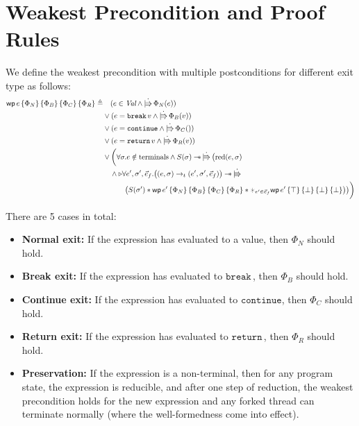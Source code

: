 \documentclass{article}
\numberwithin{algorithm}{section}
\newcommand{\progspec}[1]{\{ #1 \}}
\newcommand{\cbreak}{\texttt{break}\,}
\newcommand{\ccontinue}{\texttt{continue}}
\newcommand{\creturn}{\texttt{return}\,}
\newcommand{\tred}{\rightarrow_t}
\newcommand{\cred}{\text{red}}
\newcommand{\wand}{-\mkern-8mu*\,}
\newcommand{\upd}{\dot{|\mkern-8mu\Rrightarrow}\,}
\newcommand{\later}{\triangleright}
\newcommand{\wpre}[5]{\textsf{wp}\, #1\, \progspec{#2}\, \progspec{#3}\, \progspec{#4}\, \progspec{#5}}
\begin{document}

\section{Weakest Precondition and Proof Rules}

We define the weakest precondition with multiple postconditions for different exit type as follows:
$$
\begin{aligned}
    \wpre{e}{\Phi_N}{\Phi_B}{\Phi_C}{\Phi_R} \triangleq& \quad
           (e \in \textit{Val} \land \upd \Phi_N(e)) \\
    & \lor (e = \cbreak v \land \upd \Phi_B(v)) \\
    & \lor (e = \ccontinue \land \upd \Phi_C()) \\
    & \lor (e = \creturn v \land \upd \Phi_R(v)) \\
    & \lor \biggl(\forall \sigma. e \notin \text{terminals} \land S(\sigma) \wand \upd \bigl(\cred(e, \sigma) \\
    & \quad \land \later
        \forall e', \sigma', \vec{e}_f. \bigl((e, \sigma) \tred (e', \sigma', \vec{e}_f)\bigr) \wand \upd \\
    & \quad\quad\quad \bigl(S(\sigma') * \wpre{e'}{\Phi_N}{\Phi_B}{\Phi_C}{\Phi_R} * \varhexstar_{e'\in\vec{e}_f} \wpre{e'}{\top}{\bot}{\bot}{\bot} \bigr)\bigr)\biggr)
\end{aligned}
$$

There are 5 cases in total:
\begin{itemize}
\item \textbf{Normal exit:} If the expression has evaluated to a value, then $\Phi_N$ should hold.
\item \textbf{Break exit:} If the expression has evaluated to $\cbreak\!$, then $\Phi_B$ should hold.
\item \textbf{Continue exit:} If the expression has evaluated to $\ccontinue$, then $\Phi_C$ should hold.
\item \textbf{Return exit:} If the expression has evaluated to $\creturn\!$, then $\Phi_R$ should hold.
\item \textbf{Preservation:} If the expression is a non-terminal, then for any program state, the expression is reducible, and after one step of reduction, the weakest precondition holds for the new expression and any forked thread can terminate normally (where the well-formedness come into effect).
\end{itemize}
\end{document}
